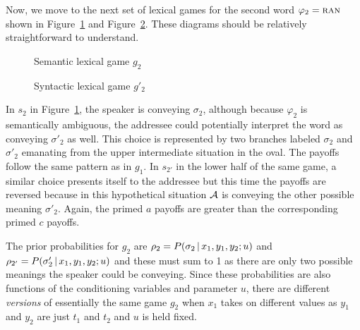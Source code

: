 Now, we move to the next set of lexical games for the second word $\varphi_2 = \Expression{ran}$ shown in Figure~\ref{fig:semantic lexical game g2} and Figure~\ref{fig:syntactic lexical game g2'}. These diagrams should be relatively straightforward to understand.

\begin{figure}[h] 

\caption{Semantic lexical game $g_2$}
\label{fig:semantic lexical game g2}
\end{figure}

\begin{figure}[h] 

\caption{Syntactic lexical game $g'_2$}
\label{fig:syntactic lexical game g2'}
\end{figure}

In $s_2$ in Figure~\ref{fig:semantic lexical game g2}, the speaker is conveying $\sigma_2$, although because $\varphi_2$ is semantically ambiguous, the addressee could potentially interpret the word as conveying $\sigma'_2$ as well. This choice is represented by two branches labeled $\sigma_2$ and $\sigma'_2$ emanating from the upper intermediate situation in the oval. The payoffs follow the same pattern as in $g_1$. In $s_{2'}$ in the lower half of the same game, a similar choice presents itself to the addressee but this time the payoffs are reversed because in this hypothetical situation $\cal A$ is conveying the other possible meaning $\sigma'_2$. Again, the primed $a$ payoffs are greater than the corresponding primed $c$ payoffs.

The prior probabilities for $g_2$ are $\rho_2 = P(\sigma_2 \,|\, x_1, y_1, y_2; u)$ and $\rho_{2'} = P(\sigma'_2 \,|\, x_1,\allowbreak y_1,\allowbreak y_2; u)$ and these must sum to 1 as there are only two possible meanings the speaker could be conveying. Since these probabilities are also functions of the conditioning variables and parameter $u$, there are different \emph{versions} of essentially the same game $g_2$ when $x_1$ takes on different values as $y_1$ and $y_2$ are just $t_1$ and $t_2$ and $u$ is held fixed.

